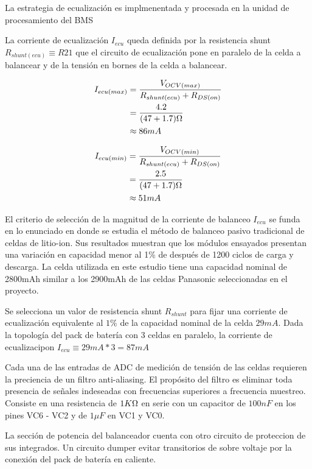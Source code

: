 \documentclass[10pt,a4paper]{article}
\begin{document}
\begin{itemize}
La estrategia de ecualización es implmenentada y procesada en la unidad de
procesamiento del \acrshort{BMS}

La corriente de ecualización $I_{ecu}$ queda definida por la resistencia shunt
$R_{shunt(ecu)} \equiv R21$ que el circuito de ecualización pone en paralelo de
la celda a balancear y de la tensión en bornes de la celda a balancear. 

\begin{align}
    I_{ecu (max)} &= \frac{V_{OCV(max)}}{R_{shunt(ecu)}+R_{DS (on)}}\\
    &= \frac{4.2}{(47 + 1.7)\ohm}\\
    &\approx 86mA
\end{align}

\begin{align}
    I_{ecu (min)} &= \frac{V_{OCV(min)}}{R_{shunt(ecu)}+R_{DS (on)}}\\
    &= \frac{2.5}{(47 + 1.7)\ohm}\\
    &\approx 51mA
\end{align}

El criterio de selección de la magnitud de la corriente de balanceo $I_{ecu}$ se
funda en lo enunciado en \cite{CAMPESTRINI2016142} donde se estudia el método de
balanceo pasivo tradicional de celdas de litio-ion. Sus resultados muestran que
los m\'odulos ensayados presentan una variaci\'on en capacidad menor al 1\% de
despu\'es de 1200 ciclos de carga y descarga. La celda utilizada en este estudio
tiene una capacidad nominal de 2800mAh similar a los 2900mAh de las celdas
Panasonic seleccionadas en el proyecto.

Se selecciona un valor de resistencia shunt $R_{shunt}$ para fijar una corriente
de ecualización equivalente al $1\%$ de la capacidad nominal de la celda $29mA$. 
Dada la topología del pack de batería con 3 celdas en paralelo, la corriente de
ecualizacipon $I_{ecu} \equiv 29mA * 3 = 87 mA$

Cada una de las entradas de ADC de medición de tensión de las celdas requieren
la preciencia de un filtro anti-aliasing. El propósito del filtro es eliminar
toda presencia de señales indeseadas con frecuencias superiores a frecuencia
muestreo. Consiste en una resistencia de $1 K\ohm$ en serie con un capacitor de
$100 nF$ en los pines VC6 - VC2 y de $1 \mu F$ en VC1 y VC0.

La sección de potencia del balanceador cuenta con otro circuito de proteccion de
sus integrados. Un circuito dumper evitar transitorios de sobre voltaje por la
conexión del pack de batería en caliente. 


\end{itemize}
\end{document}
